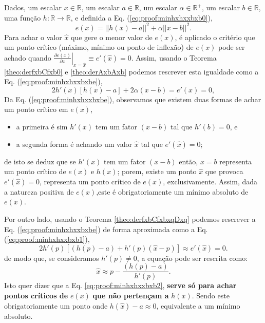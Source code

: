 \begin{myproofT}\label{proof:theo:minhxhxxbxb}
Dados,
um escalar $x \in \mathbb{R}$, 
um escalar $a \in \mathbb{R}$,
um escalar $\alpha \in \mathbb{R}^{+}$,
um escalar $b \in \mathbb{R}$,
uma função $h:\mathbb{R} \rightarrow \mathbb{R}$, e 
definida a Eq. (\ref{eq:proof:minhxhxxbxb0}),
\begin{equation}\label{eq:proof:minhxhxxbxb0}
e(x)=||h(x)-a||^2+\alpha ||x-b||^2.
\end{equation}
Para achar o valor  $\hat{x}$ que gere o menor valor de $e(x)$, é aplicado
o critério que um ponto crítico (máximo, mínimo ou ponto de inflexão) de $e(x)$ pode ser achado quando 
$\left. \frac{\partial e(x)}{\partial x }\right|_{x=\hat{x}} \equiv e'(\hat{x}) =0$.
Assim, 
usando o Teorema \ref{theo:derfxbCfxb0} e \ref{theo:derAxbAxb} podemos 
rescrever esta igualdade como a Eq. (\ref{eq:proof:minhxhxxbxbe}),
\begin{equation}\label{eq:proof:minhxhxxbxbe}
2  h'(x) \left[h(x) -a\right]+2\alpha (x-b)= e'(x)=0,
\end{equation}
Da Eq. (\ref{eq:proof:minhxhxxbxbe}), observamos 
que existem duas formas de achar um ponto crítico em $e(x)$,
\begin{itemize}
 \item a primeira é sim $h'(x)$ tem um fator $(x-b)$ tal que $h'(b)=0$, e
 \item a segunda forma é achando um valor $\hat{x}$ tal que $e'(\hat{x})=0$;
\end{itemize}
de isto se deduz que se $h'(x)$ tem um fator $(x-b)$ então, $x=b$ representa um ponto crítico de $e(x)$ e $h(x)$;
porem, existe um ponto $\hat{x}$ que provoca $e'(\hat{x})=0$, representa um ponto crítico de $e(x)$, exclusivamente. 
Assim, dada a natureza positiva de $e(x)$,este é obrigatoriamente um mínimo absoluto de $e(x)$.

Por outro lado, usando o Teorema \ref{theo:derfxbCfxbxqDxq} podemos 
rescrever a Eq. (\ref{eq:proof:minhxhxxbxbe}) de forma aproximada como a Eq. (\ref{eq:proof:minhxhxxbxb1}),
\begin{equation}\label{eq:proof:minhxhxxbxb1}
2  h'(p) \left[\left(h(p)-a\right) + h'(p) \left(\hat{x} - p\right)\right] \approx
e'(\hat{x})=0.
\end{equation}
de modo que, se consideramos $h'(p)\neq 0$, a equação pode ser rescrita como:
\begin{equation}\label{eq:proof:minhxhxxbxb2}
\hat{x} \approx p - \frac{\left(h(p)-a\right)}{h'(p)}.
\end{equation}
Isto quer dizer que a Eq. \ref{eq:proof:minhxhxxbxb2}, \textbf{serve só para
achar pontos críticos de} $e(x)$ \textbf{que não pertençam a} $h(x)$.
Sendo este obrigatoriamente um ponto onde $h(\hat{x})-a\approx 0$, 
equivalente a um mínimo absoluto.


\end{myproofT}

